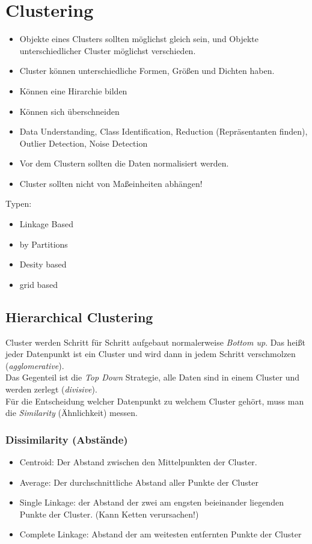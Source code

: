 \documentclass[a4paper]{scrartcl}
\begin{document}
\section{Clustering}
\begin{itemize}
\item Objekte eines Clusters sollten möglichst gleich sein, und Objekte unterschiedlicher Cluster möglichst verschieden.
\item Cluster können unterschiedliche Formen, Größen und Dichten haben.
\item Können eine Hirarchie bilden
\item Können sich überschneiden
\item Data Understanding, Class Identification, Reduction (Repräsentanten finden), Outlier Detection, Noise Detection
\item Vor dem Clustern sollten die Daten normalisiert werden.
\item Cluster sollten nicht von Maßeinheiten abhängen!
\end{itemize}
Typen:
\begin{itemize}
\item Linkage Based
\item by Partitions
\item Desity based
\item grid based
\end{itemize}

\subsection{Hierarchical Clustering}
Cluster werden Schritt für Schritt aufgebaut normalerweise \textit{Bottom up}. Das heißt jeder Datenpunkt ist ein Cluster und wird dann in jedem Schritt verschmolzen (\textit{agglomerative}).\\
Das Gegenteil ist die \textit{Top Down} Strategie, alle Daten sind in einem Cluster und werden zerlegt (\textit{divisive}).\\
Für die Entscheidung welcher Datenpunkt zu welchem Cluster gehört, muss man die \textit{Similarity} (Ähnlichkeit) messen.\\

\subsubsection{Dissimilarity (Abstände)}
\begin{itemize}
\item Centroid: Der Abstand zwischen den Mittelpunkten der Cluster.
\item Average: Der durchschnittliche Abstand aller Punkte der Cluster
\item Single Linkage: der Abstand der zwei am engsten beieinander liegenden Punkte der Cluster. (Kann Ketten verursachen!)
\item Complete Linkage: Abstand der am weitesten entfernten Punkte der Cluster
\end{itemize}
\end{document}
